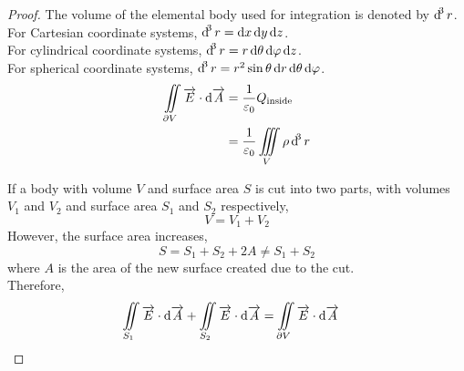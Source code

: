 \documentclass[fleqn, a4paper, 12pt, twoside]{article}
\theoremstyle{definition}
\theoremstyle{theorem}
\begin{document}
\begin{proof}
	The volume of the elemental body used for integration is denoted by $\dif^3 r$.\\
	For Cartesian coordinate systems, $\dif^3 r = \dif x \dif y \dif z$.\\
	For cylindrical coordinate systems, $\dif^3 r = r \dif \theta \dif \varphi \dif z$.\\
	For spherical coordinate systems, $\dif^3 r = r^2 \sin \theta \dif r \dif \theta \dif \varphi $.\\
	
	\begin{align*}
		\iint\limits_{\partial V} \overrightarrow{E} \cdot \dif \overrightarrow{A} &= \dfrac{1}{\varepsilon_0} Q_{\textnormal{inside}}\\
		&= \dfrac{1}{\varepsilon_0} \iiint\limits_{V} \rho \dif^3 r 
	\end{align*}
	
	If a body with volume $V$ and surface area $S$ is cut into two parts, with volumes $V_1$ and $V_2$ and surface area $S_1$ and $S_2$ respectively,
	\begin{equation*}
		V = V_1 + V_2
	\end{equation*}
	However, the surface area increases,
	\begin{equation*}
		S = S_1 + S_2 + 2 A \neq S_1 + S_2
	\end{equation*}
	where $A$ is the area of the new surface created due to the cut.\\
	Therefore,
	\begin{align*}
		\iint\limits_{S_1} \overrightarrow{E} \cdot \dif \overrightarrow{A} + \iint\limits_{S_2} \overrightarrow{E} \cdot \dif \overrightarrow{A} &= \iint\limits_{\partial V} \overrightarrow{E} \cdot \dif \overrightarrow{A}
	\end{align*}
	

\end{proof}
\end{document}
